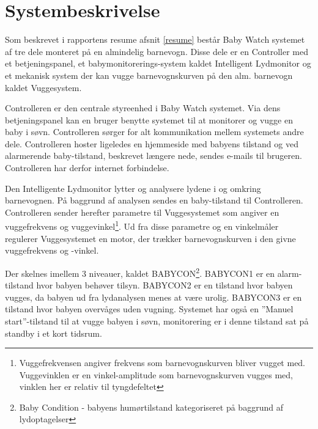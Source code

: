 \chapter{Systembeskrivelse}
Som beskrevet i rapportens resume afsnit \vref{resume} består Baby Watch systemet af tre dele monteret på en almindelig barnevogn. Disse dele er en Controller med et betjeningspanel, et babymonitorerings-system kaldet Intelligent Lydmonitor og et mekanisk system der kan vugge barnevognskurven på den alm. barnevogn kaldet Vuggesystem.

Controlleren er den centrale styreenhed i Baby Watch systemet. Via dens betjeningspanel kan en bruger benytte systemet til at monitorer og vugge en baby i søvn. Controlleren sørger for alt kommunikation mellem systemets andre dele. Controlleren hoster ligeledes en hjemmeside med babyens tilstand og ved alarmerende baby-tilstand, beskrevet længere nede, sendes e-mails til brugeren. Controlleren har derfor internet forbindelse.

Den Intelligente Lydmonitor lytter og analysere lydene i og omkring barnevognen. På baggrund af analysen sendes en baby-tilstand til Controlleren. Controlleren sender herefter parametre til Vuggesystemet som angiver en vuggefrekvens og vuggevinkel\footnote{Vuggefrekvensen angiver frekvens som barnevognskurven bliver vugget med. Vuggevinklen er en vinkel-amplitude som barnevognskurven vugges med, vinklen her er relativ til tyngdefeltet}. Ud fra disse parametre og en vinkelmåler regulerer Vuggesystemet en motor, der trækker barnevognskurven i den givne vuggefrekvens og -vinkel.  

Der skelnes imellem 3 niveauer, kaldet BABYCON\footnote{Baby Condition - babyens humørtilstand kategoriseret på baggrund af lydoptagelser}. BABYCON1 er en alarm-tilstand hvor babyen behøver tilsyn. BABYCON2 er en tilstand hvor babyen vugges, da babyen ud fra lydanalysen menes at være urolig. BABYCON3 er en tilstand hvor babyen overvåges uden vugning. Systemet har også en ''Manuel start''-tilstand til at vugge babyen i søvn, monitorering er i denne tilstand sat på standby i et kort tidsrum.


